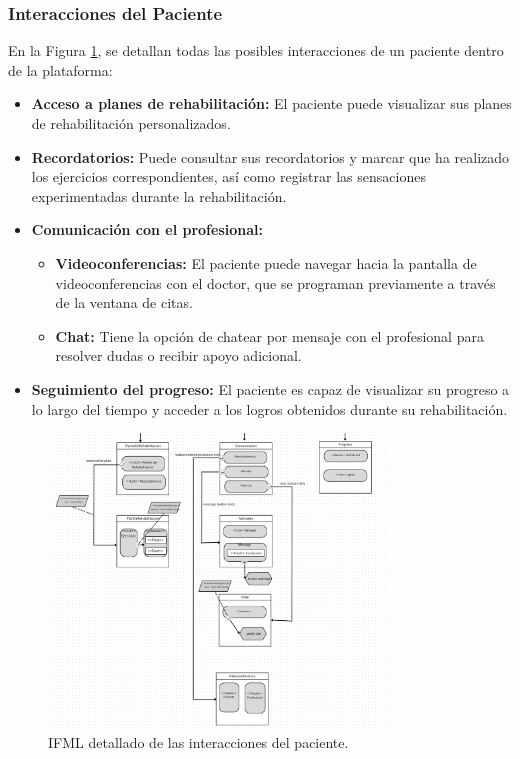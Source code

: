 \documentclass{article}
\begin{document}
\subsubsection{Interacciones del Paciente}

En la Figura \ref{fig:ifml_paciente}, se detallan todas las posibles interacciones de un paciente dentro de la plataforma:

\begin{itemize}
	\item \textbf{Acceso a planes de rehabilitación:} El paciente puede visualizar sus planes de rehabilitación personalizados.
	\item \textbf{Recordatorios:} Puede consultar sus recordatorios y marcar que ha realizado los ejercicios correspondientes, así como registrar las sensaciones experimentadas durante la rehabilitación.
	\item \textbf{Comunicación con el profesional:} 
	\begin{itemize}
		\item \textbf{Videoconferencias:} El paciente puede navegar hacia la pantalla de videoconferencias con el doctor, que se programan previamente a través de la ventana de citas.
		\item \textbf{Chat:} Tiene la opción de chatear por mensaje con el profesional para resolver dudas o recibir apoyo adicional.
	\end{itemize}
	\item \textbf{Seguimiento del progreso:} El paciente es capaz de visualizar su progreso a lo largo del tiempo y acceder a los logros obtenidos durante su rehabilitación.
\end{itemize}

\begin{figure}[H]
	\centering
	\includegraphics[width=0.8\textwidth]{images/ifml_paciente.png}
	\caption{IFML detallado de las interacciones del paciente.}
	\label{fig:ifml_paciente}
\end{figure}
\newpage
\end{document}
